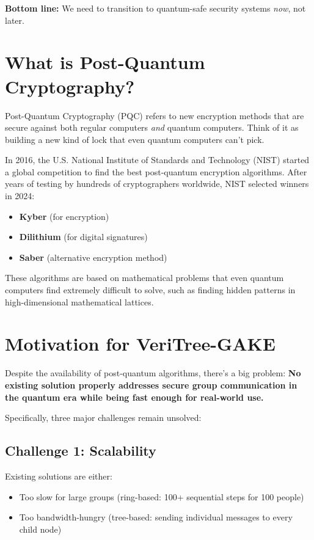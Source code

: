 \documentclass[12pt,a4paper]{report}
\begin{document}
\textbf{Bottom line:} We need to transition to quantum-safe security systems \textit{now}, not later.

\section{What is Post-Quantum Cryptography?}

Post-Quantum Cryptography (PQC) refers to new encryption methods that are secure against both regular computers \textit{and} quantum computers. Think of it as building a new kind of lock that even quantum computers can't pick.

In 2016, the U.S. National Institute of Standards and Technology (NIST) started a global competition to find the best post-quantum encryption algorithms. After years of testing by hundreds of cryptographers worldwide, NIST selected winners in 2024:

\begin{itemize}
\item \textbf{Kyber} (for encryption)
\item \textbf{Dilithium} (for digital signatures)
\item \textbf{Saber} (alternative encryption method)
\end{itemize}

These algorithms are based on mathematical problems that even quantum computers find extremely difficult to solve, such as finding hidden patterns in high-dimensional mathematical lattices.

\section{Motivation for VeriTree-GAKE}

Despite the availability of post-quantum algorithms, there's a big problem: \textbf{No existing solution properly addresses secure group communication in the quantum era while being fast enough for real-world use.}

Specifically, three major challenges remain unsolved:

\subsection{Challenge 1: Scalability}

Existing solutions are either:
\begin{itemize}
\item Too slow for large groups (ring-based: 100+ sequential steps for 100 people)
\item Too bandwidth-hungry (tree-based: sending individual messages to every child node)
\end{itemize}
\end{document}

